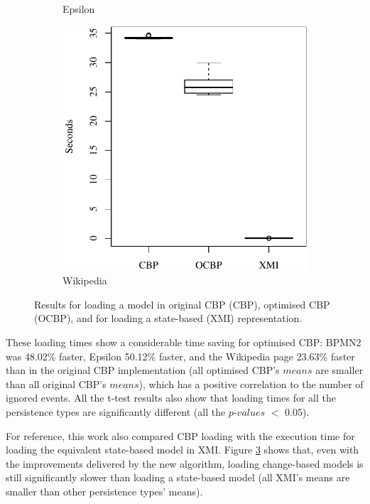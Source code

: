{\begin{figure}[ht]
\begin{subfigure}{0.325\textwidth}
    \caption{Epsilon}
    \label{fig:load_time_epsilon}
  \end{subfigure}
  \hfill
  \begin{subfigure}{0.325\textwidth}
    \centering
    \includegraphics[width=\linewidth]{images/ol_load_time_wikipedia}
    \caption{Wikipedia}
    \label{fig:load_time_wikipedia}
  \end{subfigure}
  \caption{Results for loading a model in original CBP (CBP), optimised CBP (OCBP), and for loading a state-based (XMI) representation.}
  \label{fig:loadtime}
\end{figure}

These loading times show a considerable time saving for optimised CBP: BPMN2 was 48.02\% faster, Epsilon 50.12\% faster, and the Wikipedia page 23.63\% faster than in the original CBP implementation (all optimised CBP's $means$ are  smaller than all original CBP's $means$), which has a positive correlation to the number of ignored events. All the t-test results also show that loading times for all the persistence types are significantly different (all the $p$-$values$ $<$ 0.05). 

For reference, this work also compared CBP loading with the execution time for loading the equivalent state-based model in XMI. Figure \ref{fig:loadtime} shows that, even with the improvements delivered by the new algorithm, loading change-based models is still significantly slower than loading a state-based model (all XMI's means are smaller than other persistence types' means).

}
